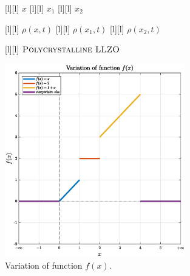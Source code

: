 \begin{figure}[ht]
	\centering
	\footnotesize

	[l] {$x$}
	[l] {$x_1$}
	[l] {$x_2$}

	[l] {$\rho(x,t)$}
	[l] {$\rho(x_{1},t)$}
	[l] {$\rho(x_{2},t)$}


	[l] {$\textsc{Polycrystalline LLZO}$}

	\includegraphics[width=0.7\textwidth]{totalvariation.eps}
	\caption{Variation of function $f(x)$.}
	\label{\LABEL}
\end{figure}
